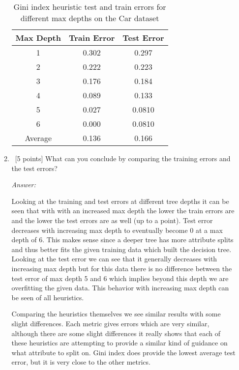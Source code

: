 \documentclass[12pt, fullpage,letterpaper]{article}
\begin{document}
\begin{enumerate}
\begin{enumerate}
\begin{table}[ht]
	\centering
	\begin{tabular}{|c|c|c|}
        \hline
		Max Depth & Train Error & Test Error\\ 
		\hline\hline
		1 & 0.302 & 0.297 \\ \hline
		2 & 0.222 & 0.223 \\ \hline
		3 & 0.176 & 0.184 \\ \hline
		4 & 0.089 & 0.133 \\ \hline
		5 & 0.027 & 0.0810 \\ \hline
		6 & 0.000 & 0.0810 \\ \hline
		Average & 0.136 & 0.166 \\ \hline
	\end{tabular}
	\caption{Gini index heuristic test and train errors for different max depths on the Car dataset}
    \label{table:2bginiindex}
\end{table}


\item~[5 points] What can you conclude by comparing the training errors and the test errors? 

\textit{Answer:} 

Looking at the training and test errors at different tree depths it can be seen that with with an increased max depth the lower the train errors are and the lower the test errors are as well (up to a point). 
Test error decreases with increasing max depth to eventually become 0 at a max depth of 6.
This makes sense since a deeper tree has more attribute splits and thus better fits the given training data which built the decision tree. 
Looking at the test error we can see that it generally decreases with increasing max depth but for this data there is no difference between the test error of max depth 5 and 6 which implies beyond this depth we are overfitting the given data.
This behavior with increasing max depth can be seen of all heuristics.

Comparing the heuristics themselves we see similar results with some slight differences. 
Each metric gives errors which are very similar, although there are some slight differences it really shows that each of these heuristics are attempting to provide a similar kind of guidance on what attribute to split on. 
Gini index does provide the lowest average test error, but it is very close to the other metrics. 

\end{enumerate}


\end{enumerate}
\end{document}
